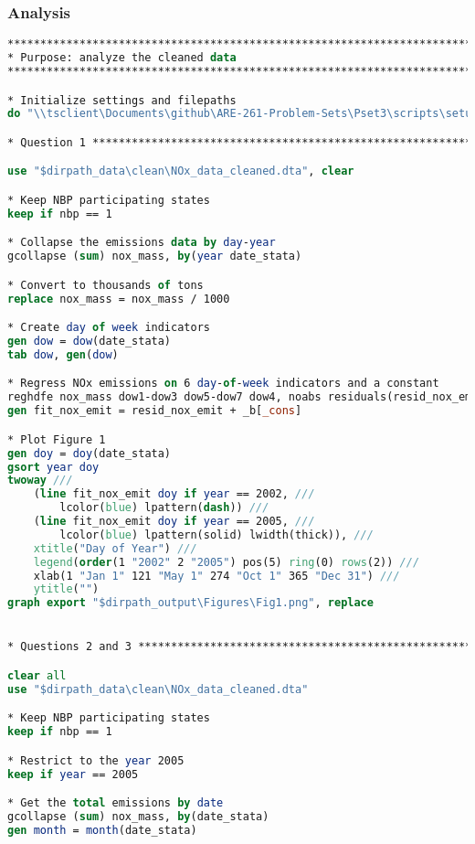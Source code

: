 \documentclass[12pt]{article}
\begin{document}
\subsubsection*{Analysis}
\begin{lstlisting}[language=Stata, numbers=none]
******************************************************************************
* Purpose: analyze the cleaned data
******************************************************************************

* Initialize settings and filepaths
do "\\tsclient\Documents\github\ARE-261-Problem-Sets\Pset3\scripts\setup.do"

* Question 1 *******************************************************************

use "$dirpath_data\clean\NOx_data_cleaned.dta", clear

* Keep NBP participating states
keep if nbp == 1

* Collapse the emissions data by day-year
gcollapse (sum) nox_mass, by(year date_stata)

* Convert to thousands of tons
replace nox_mass = nox_mass / 1000

* Create day of week indicators
gen dow = dow(date_stata)
tab dow, gen(dow)

* Regress NOx emissions on 6 day-of-week indicators and a constant
reghdfe nox_mass dow1-dow3 dow5-dow7 dow4, noabs residuals(resid_nox_emit)
gen fit_nox_emit = resid_nox_emit + _b[_cons]

* Plot Figure 1
gen doy = doy(date_stata)
gsort year doy
twoway ///
	(line fit_nox_emit doy if year == 2002, /// 
		lcolor(blue) lpattern(dash)) ///
	(line fit_nox_emit doy if year == 2005, ///
		lcolor(blue) lpattern(solid) lwidth(thick)), ///
	xtitle("Day of Year") ///
	legend(order(1 "2002" 2 "2005") pos(5) ring(0) rows(2)) ///
	xlab(1 "Jan 1" 121 "May 1" 274 "Oct 1" 365 "Dec 31") ///
	ytitle("")
graph export "$dirpath_output\Figures\Fig1.png", replace


* Questions 2 and 3 **********************************************************

clear all
use "$dirpath_data\clean\NOx_data_cleaned.dta"

* Keep NBP participating states
keep if nbp == 1

* Restrict to the year 2005
keep if year == 2005

* Get the total emissions by date
gcollapse (sum) nox_mass, by(date_stata)
gen month = month(date_stata)


\end{lstlisting}
\end{document}

